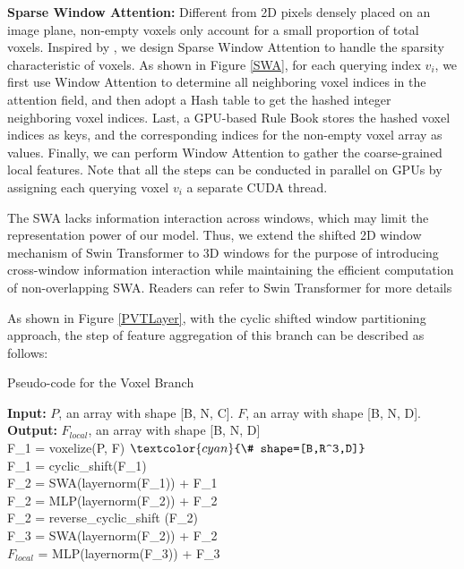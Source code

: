 \documentclass[10pt,twocolumn,letterpaper]{article}
\begin{document}
\textbf{Sparse Window Attention:} Different from 2D pixels
densely placed on an image plane, non-empty voxels only account for a small proportion of total voxels. Inspired by \cite{sparse,SECOND}, we design Sparse Window Attention to handle the sparsity characteristic of voxels. As shown in Figure \ref{SWA}, for each querying index $v_i$, we first use Window Attention to determine all neighboring voxel indices in the attention field, and then adopt a Hash table to get the hashed integer neighboring voxel indices. Last, a GPU-based Rule Book stores the hashed voxel indices as keys, and the corresponding indices for the non-empty voxel array as values. Finally, we can perform Window Attention to gather the coarse-grained local features. Note that all the steps can be conducted in parallel on GPUs by assigning each querying voxel $v_i$ a separate CUDA thread.

The SWA lacks information interaction across windows, which may limit the representation power of our model.
Thus, we extend the shifted 2D window mechanism of Swin Transformer \cite{liu2021swin} to 3D windows for the purpose of introducing cross-window information interaction while maintaining the efficient computation of non-overlapping SWA. Readers can refer to Swin Transformer for more details

As shown in Figure \ref{PVTLayer}, with the cyclic shifted window partitioning approach, the step of feature aggregation of this branch can be described as follows:

\begin{algorithm}[H]
    \caption{ Pseudo-code for the Voxel Branch}\label{Pseudo-code}\hspace*{0.02in} { \textbf{Input:} $P$, an array with shape [B, N, C]. $F$, an array with shape [B, N, D].} \\
    \hspace*{0.02in} { \textbf{Output:} $F_{local}$, an array with shape [B, N, D]}\\
    \hspace*{0.04in} F\_1 = voxelize(P, F) $\textcolor{cyan}{\# shape=[B,R^3,D]}$\\
    \hspace*{0.04in} F\_1 = cyclic\_shift(F\_1)\\
    \hspace*{0.04in} F\_2 = SWA(layernorm(F\_1)) + F\_1\\
    \hspace*{0.04in} F\_2 = MLP(layernorm(F\_2)) + F\_2\\
    \hspace*{0.04in} F\_2 = reverse\_cyclic\_shift (F\_2)\\
    \hspace*{0.04in} F\_3 = SWA(layernorm(F\_2)) + F\_2\\
    \hspace*{0.04in} $F_{local}$ = MLP(layernorm(F\_3)) + F\_3\\
\end{algorithm}
\end{document}
